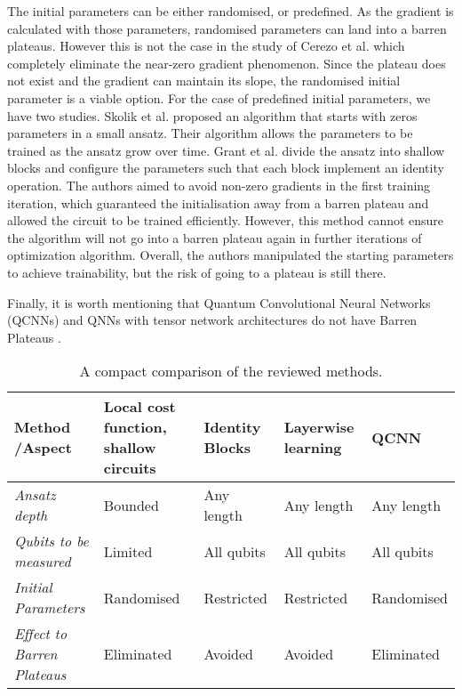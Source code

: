 The initial parameters can be either randomised, or predefined.
As the gradient is calculated with those parameters, randomised parameters can land into a barren plateaus.
However this is not the case in the study of Cerezo et al. which completely eliminate the near-zero gradient phenomenon.
Since the plateau does not exist and the gradient can maintain its slope, the randomised initial parameter is a viable option.
For the case of predefined initial parameters, we have two studies.
Skolik et al. \cite{skolikLayerwiseLearningQuantum2021} proposed an algorithm that starts with zeros parameters in a small ansatz.
Their algorithm allows the parameters to be trained as the ansatz grow over time.
Grant et al. \cite{grantInitializationStrategyAddressing2019} divide the ansatz into shallow blocks and configure the parameters such that each block implement an identity operation.
The authors aimed to avoid non-zero gradients in the first training iteration, which guaranteed the initialisation away from a barren plateau and allowed the circuit to be trained efficiently.
However, this method cannot ensure the algorithm will not go into a barren plateau again in further iterations of optimization algorithm.
Overall, the authors manipulated the starting parameters to achieve trainability, but the risk of going to a plateau is still there.

Finally, it is worth mentioning that Quantum Convolutional Neural Networks (QCNNs) and QNNs with tensor network architectures do not have Barren Plateaus \cite{congQuantumConvolutionalNeural2019}.

\begin{table}[]
    \centering
    \begin{tabular}{|p{3cm}|p{2cm}|p{2cm}|p{2cm}|p{2cm}|}
        \hline
        \textbf{Method /\newline Aspect}             & \textbf{Local cost function, shallow circuits} & \textbf{Identity Blocks} & \textbf{Layerwise learning} & \textbf{QCNN} \\
        \hline
        \raggedright\emph{Ansatz depth}              & Bounded                                        & Any length               & Any length                  & Any length    \\
        \hline
        \raggedright\emph{Qubits to be measured}     & Limited                                        & All qubits               & All qubits                  & All qubits    \\
        \hline
        \raggedright\emph{Initial Parameters}        & Randomised                                     & Restricted               & Restricted                  & Randomised    \\
        \hline \hline
        \raggedright\emph{Effect to Barren Plateaus} & Eliminated                                     & Avoided                  & Avoided                     & Eliminated    \\
        \hline
    \end{tabular}
    \caption{A compact comparison of the reviewed methods.}
    \label{quick comparison of methods}
\end{table}

